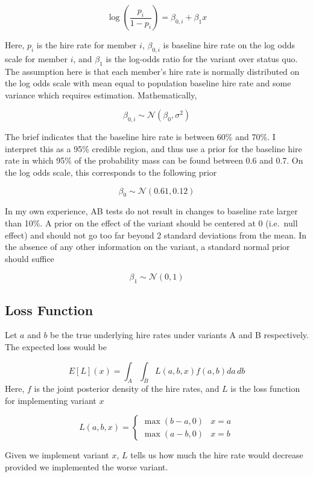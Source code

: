 \documentclass[]{article}
\begin{document}
\[ \log\left( \dfrac{p_i}{1-p_i} \right) = \beta_{0,i} + \beta_1 x \]

Here, \(p_i\) is the hire rate for member \(i\), \(\beta_{0,i}\) is
baseline hire rate on the log odds scale for member \(i\), and
\(\beta_1\) is the log-odds ratio for the variant over status quo. The
assumption here is that each member's hire rate is normally distributed
on the log odds scale with mean equal to population baseline hire rate
and some variance which requires estimation. Mathematically,

\[\beta_{0,i} \sim \mathcal{N}(\beta_0, \sigma^2)\]

The brief indicates that the baseline hire rate is between 60\% and
70\%. I interpret this as a 95\% credible region, and thus use a prior
for the baseline hire rate in which 95\% of the probability mass can be
found between 0.6 and 0.7. On the log odds scale, this corresponds to
the following prior

\[ \beta_0 \sim \mathcal{N}(0.61, 0.12)\]

In my own experience, AB tests do not result in changes to baseline rate
larger than 10\%. A prior on the effect of the variant should be
centered at 0 (i.e.~null effect) and should not go too far beyond 2
standard deviations from the mean. In the absence of any other
information on the variant, a standard normal prior should suffice

\[ \beta_1 \sim \mathcal{N}(0,1) \]

\hypertarget{loss-function}{%
\subsection{Loss Function}\label{loss-function}}

Let \(a\) and \(b\) be the true underlying hire rates under variants A
and B respectively. The expected loss would be

\[ E[L](x)=\int_{A} \int_{B} L(a, b, x) f(a, b) da\, db \] Here, \(f\)
is the joint posterior density of the hire rates, and \(L\) is the loss
function for implementing variant \(x\)

\[ L(a, b, x)=\left\{\begin{array}{ll}
\max (b-a, 0) & x=a \\
\max (a-b, 0) & x=b
\end{array}\right. \]

Given we implement variant \(x\), \(L\) tells us how much the hire rate
would decrease provided we implemented the worse variant.
\end{document}
